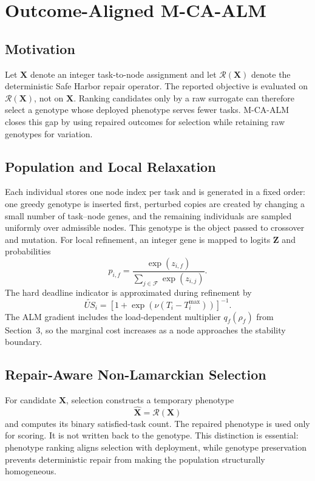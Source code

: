 \section{Outcome-Aligned M-CA-ALM}

\subsection{Motivation}
Let $\mathbf{X}$ denote an integer task-to-node assignment and let $\mathcal{R}(\mathbf{X})$ denote the deterministic Safe Harbor repair operator. The reported objective is evaluated on $\mathcal{R}(\mathbf{X})$, not on $\mathbf{X}$. Ranking candidates only by a raw surrogate can therefore select a genotype whose deployed phenotype serves fewer tasks. M-CA-ALM closes this gap by using repaired outcomes for selection while retaining raw genotypes for variation.

\subsection{Population and Local Relaxation}
Each individual stores one node index per task and is generated in a fixed order: one greedy genotype is inserted first, perturbed copies are created by changing a small number of task--node genes, and the remaining individuals are sampled uniformly over admissible nodes. This genotype is the object passed to crossover and mutation. For local refinement, an integer gene is mapped to logits $\mathbf{Z}$ and probabilities
\begin{equation}
 p_{i,f}=\frac{\exp(z_{i,f})}{\sum_{j\in\mathcal{F}}\exp(z_{i,j})}.
\end{equation}
The hard deadline indicator is approximated during refinement by
\begin{equation}
 \widetilde{US}_i=\left[1+\exp\left(\nu(T_i-T_i^{\max})\right)\right]^{-1}.
\end{equation}
The ALM gradient includes the load-dependent multiplier $q_f(\rho_f)$ from Section~3, so the marginal cost increases as a node approaches the stability boundary.

\subsection{Repair-Aware Non-Lamarckian Selection}
For candidate $\mathbf{X}$, selection constructs a temporary phenotype
\begin{equation}
 \widehat{\mathbf{X}}=\mathcal{R}(\mathbf{X})
\end{equation}
and computes its binary satisfied-task count. The repaired phenotype is used only for scoring. It is not written back to the genotype. This distinction is essential: phenotype ranking aligns selection with deployment, while genotype preservation prevents deterministic repair from making the population structurally homogeneous.

